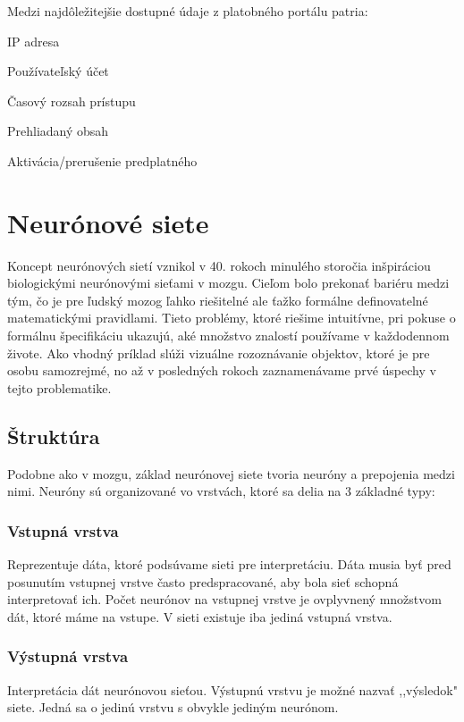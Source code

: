 Medzi najdôležitejšie dostupné údaje z platobného portálu patria:

\begin{my_itemize}
	\item {IP adresa}
	\item {Používateľský účet}
	\item {Časový rozsah prístupu}
	\item {Prehliadaný obsah}
	\item {Aktivácia/prerušenie predplatného}
\end{my_itemize}

\section{Neurónové siete}
\label{analyza_neuronove_siete}

Koncept neurónových sietí vznikol v 40. rokoch minulého storočia inšpiráciou biologickými neurónovými sieťami v mozgu. Cieľom bolo prekonať bariéru medzi tým, čo je pre ľudský mozog ľahko riešitelné ale ťažko formálne definovatelné matematickými pravidlami. Tieto problémy, ktoré riešime intuitívne, pri pokuse o formálnu špecifikáciu ukazujú, aké množstvo znalostí používame v každodennom živote. Ako vhodný príklad slúži vizuálne rozoznávanie objektov, ktoré je pre osobu samozrejmé, no až v posledných rokoch zaznamenávame prvé úspechy v tejto problematike.  

\subsection{Štruktúra}
\label{analyza_struktura_nn}

Podobne ako v mozgu, základ neurónovej siete tvoria neuróny a prepojenia medzi nimi. Neuróny sú organizované vo vrstvách, ktoré sa delia na 3 základné typy:

\subsubsection{Vstupná vrstva}
\label{analyza_vstupna_vrstva_nn}

Reprezentuje dáta, ktoré podsúvame sieti pre interpretáciu. Dáta musia byť pred posunutím vstupnej vrstve často predspracované, aby bola sieť schopná interpretovať ich. Počet neurónov na vstupnej vrstve je ovplyvnený množstvom dát, ktoré máme na vstupe. V sieti existuje iba jediná vstupná vrstva.

\subsubsection{Výstupná vrstva}
\label{analyza_vystupna_vrstva_nn}
Interpretácia dát neurónovou sieťou. Výstupnú vrstvu je možné nazvať ,,výsledok" siete. Jedná sa o jedinú vrstvu s obvykle jediným neurónom. 

